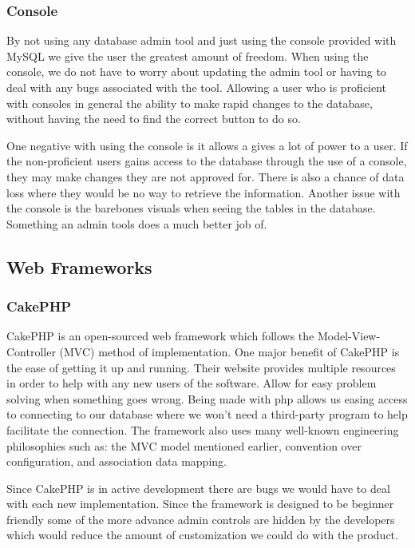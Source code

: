 \documentclass[onecolumn, draftclsnofoot,10pt, compsoc]{IEEEtran}
\begin{document}
\subsubsection{Console}

By not using any database admin tool and just using the console provided with MySQL we give the user the greatest amount of freedom. When using the console, we do not have to worry about updating the admin tool or having to deal with any bugs associated with the tool. Allowing a user who is proficient with consoles in general the ability to make rapid changes to the database, without having the need to find the correct button to do so. 

One negative with using the console is it allows a gives a lot of power to a user. If the non-proficient users gains access to the database through the use of a console, they may make changes they are not approved for. There is also a chance of data loss where they would be no way to retrieve the information. Another issue with the console is the barebones visuals when seeing the tables in the database. Something an admin tools does a much better job of. 

\subsection{Web Frameworks}
\subsubsection{CakePHP}

CakePHP is an open-sourced web framework which follows the Model-View-Controller (MVC) method of implementation. One major benefit of CakePHP is the ease of getting it up and running. Their website provides multiple resources in order to help with any new users of the software. Allow for easy problem solving when something goes wrong. Being made with php allows us easing access to connecting to our database where we won’t need a third-party program to help facilitate the connection. The framework also uses many well-known engineering philosophies such as: the MVC model mentioned earlier, convention over configuration, and association data mapping.

Since CakePHP is in active development there are bugs we would have to deal with each new implementation. Since the framework is designed to be beginner friendly some of the more advance admin controls are hidden by the developers which would reduce the amount of customization we could do with the product. 
\end{document}

